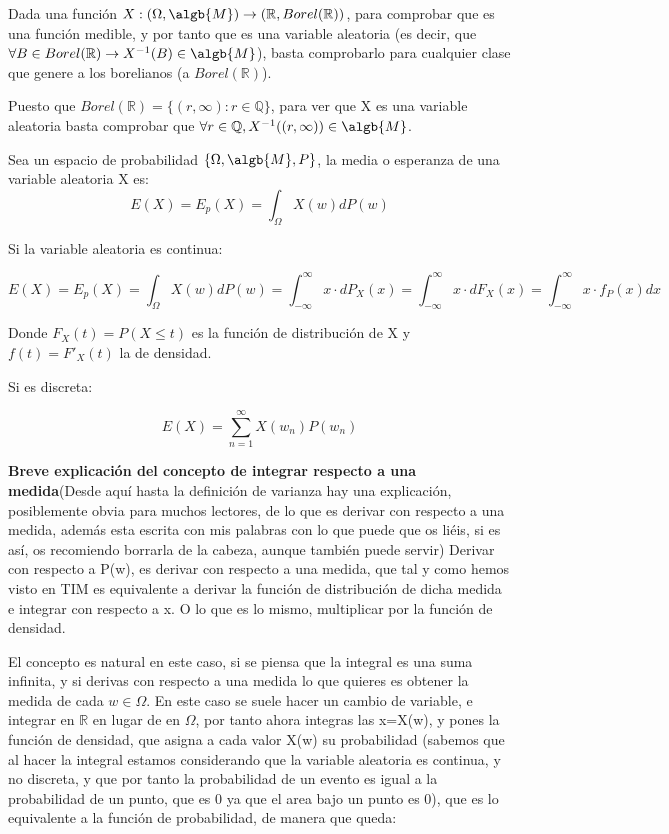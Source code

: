 \documentclass{apuntes}
\begin{document}
\begin{example}
\obs Dada una función $X:(\Omega, \algb{M}) \rightarrow (\mathbb{R}, Borel(\mathbb{R}))$, para comprobar que es una función medible, y por tanto que es una variable aleatoria (es decir, que $\forall B \in Borel(\mathbb{R}) \rightarrow X^{-1}(B) \in \algb{M}$), basta comprobarlo para cualquier clase que genere a los borelianos (a $Borel(\mathbb{R})$).

Puesto que $Borel(\mathbb{R})=\{(r,\infty): r\in \mathbb{Q}\}$, para ver que X es una variable aleatoria basta comprobar que $\forall r \in \mathbb{Q}, X^{-1}((r, \infty)) \in \algb{M}$.

\end{example}

\begin{defn}
Sea un espacio de probabilidad $\{\Omega, \algb{M},P\}$, la media o esperanza de una variable aleatoria X es:
\[
E(X)=E_p(X)=\int_{\Omega}X(w)dP(w)
\]

Si la variable aleatoria es continua:

\[
E(X)=E_p(X)=\int_{\Omega}X(w)dP(w) = \int_{-\infty}^{\infty}x\cdot dP_X(x)= \int_{-\infty}^{\infty}x\cdot dF_X(x) = \int_{-\infty}^{\infty}x\cdot f_P(x) dx
\]

Donde $F_X(t)=P(X \leq t)$ es la función de distribución de X y $f(t)=F'_X(t)$ la de densidad.

Si es discreta:

\[
E(X)=\sum_{n=1}^{\infty}X(w_n)P(w_n)
\]


\obs \textbf{Breve explicación del concepto de integrar respecto a una medida}(Desde aquí hasta la definición de varianza hay una explicación, posiblemente obvia para muchos lectores,  de lo que es derivar con respecto a una medida, además esta escrita con mis palabras con lo que puede que os liéis, si es así, os recomiendo borrarla de la cabeza, aunque también puede servir) Derivar con respecto a P(w), es derivar con respecto a una medida, que tal y como hemos visto en TIM es equivalente a derivar la función de distribución de dicha medida e integrar con respecto a x. O lo que es lo mismo, multiplicar por la función de densidad.

El concepto es natural en este caso, si se piensa que la integral es una suma infinita, y si derivas con respecto a una medida lo que quieres es obtener la medida de cada $w \in \Omega$. En este caso se suele hacer un cambio de variable, e integrar en $\mathbb{R}$ en lugar de en $\Omega$, por tanto ahora integras las x=X(w), y pones la función de densidad, que asigna a cada valor X(w) su probabilidad (sabemos que al hacer la integral estamos considerando que la variable aleatoria es continua, y no discreta, y que por tanto la probabilidad de un evento es igual a la probabilidad de un punto, que es 0 ya que el area bajo un punto es 0), que es lo equivalente a la función de probabilidad, de manera que queda:


\end{defn}
\end{document}
